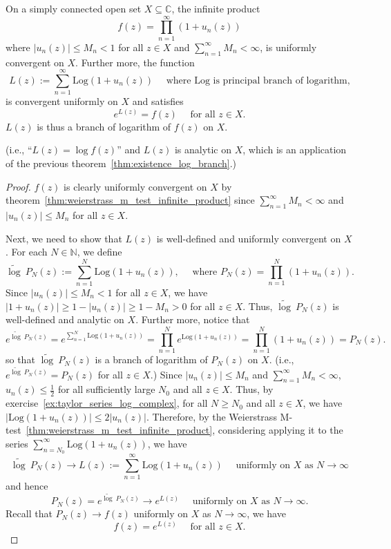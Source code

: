 \documentclass{elegantbook}
\begin{document}
\begin{theorem} \label{thm:uniform_convergence_log_infinite_product}
  On a simply connected open set $X \subseteq \mathbb{C}$, the infinite product
  \[
    f(z) = \prod_{n=1}^{\infty} (1 + u_n(z))  
  \]
  where $|u_n(z)|\leq M_n<1$ for all $z \in X$ and $\sum_{n=1}^{\infty} M_n < \infty$, is uniformly convergent on $X$. Further more, the function
  \[
    L(z) := \sum_{n=1}^{\infty} \mathrm{Log}(1 + u_n(z)) \quad \text{ where } \mathrm{Log} \text{ is principal branch of logarithm,}
  \]
  is convergent uniformly on $X$ and satisfies
  \[
    e^{L(z)} = f(z) \quad \text{ for all } z \in X.
  \]
  $L(z)$ is thus a branch of logarithm of $f(z)$ on $X$.

  (i.e., ``$L(z)=\log f(z)$'' and $L(z)$ is analytic on $X$, which is an application of the previous theorem~\ref{thm:existence_log_branch}.)
\end{theorem}

\begin{proof}
  $f(z)$ is clearly uniformly convergent on $X$ by theorem~\ref{thm:weierstrass_m_test_infinite_product} since $\sum_{n=1}^{\infty} M_n < \infty$ and $|u_n(z)| \leq M_n$ for all $z \in X$.

  Next, we need to show that $L(z)$ is well-defined and uniformly convergent on $X$. For each $N \in \mathbb{N}$, we define
  \[
    \widetilde{\log} \ P_N(z) := \sum_{n=1}^{N} \mathrm{Log}(1 + u_n(z)), \quad \text{ where } P_N(z) = \prod_{n=1}^{N} (1 + u_n(z)).
  \]
  Since $|u_n(z)| \leq M_n < 1$ for all $z \in X$, we have $|1 + u_n(z)| \geq 1 - |u_n(z)| \geq 1 - M_n > 0$ for all $z \in X$. Thus, $\widetilde{\log} \ P_N(z)$ is well-defined and analytic on $X$.
  Further more, notice that
  \[
    e^{\widetilde{\log} \ P_N(z)} = e^{\sum_{n=1}^{N} \mathrm{Log}(1 + u_n(z))} = \prod_{n=1}^{N} e^{\mathrm{Log}(1 + u_n(z))} = \prod_{n=1}^{N} (1 + u_n(z)) = P_N(z).
  \]
  so that $\widetilde{\log} \ P_N(z)$ is a branch of logarithm of $P_N(z)$ on $X$. (i.e., $e^{\widetilde{\log} \ P_N(z)} = P_N(z)$ for all $z \in X$.) Since $|u_n(z)| \leq M_n$ and $\sum_{n=1}^{\infty} M_n < \infty$, $u_n(z) \leq \frac{1}{2}$ for all sufficiently large $N_0$ and all $z \in X$. Thus, by exercise~\ref{ex:taylor_series_log_complex}, for all $N \geq N_0$ and all $z \in X$, we have $|\mathrm{Log}(1 + u_n(z))| \leq 2 |u_n(z)|$. Therefore, by the Weierstrass M-test~\ref{thm:weierstrass_m_test_infinite_product}, considering applying it to the series $\sum_{n=N_0}^{\infty} \mathrm{Log}(1 + u_n(z))$, we have
  \[
    \widetilde{\log} \ P_N(z) \to L(z) := \sum_{n=1}^{\infty} \mathrm{Log}(1 + u_n(z)) \quad \text{ uniformly on } X \text{ as } N \to \infty
  \]
  and hence
  \[
    P_N(z)= e^{\widetilde{\log} \ P_N(z)} \to e^{L(z)} \quad \text{ uniformly on } X \text{ as } N \to \infty.
  \]
  Recall that $P_N(z) \to f(z)$ uniformly on $X$ as $N \to \infty$, we have
  \[
    f(z) = e^{L(z)} \quad \text{ for all } z \in X.
  \]
\end{proof}
\end{document}

